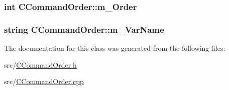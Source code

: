 \subsubsection[{\texorpdfstring{m\+\_\+\+Order}{m_Order}}]{\setlength{\rightskip}{0pt plus 5cm}int C\+Command\+Order\+::m\+\_\+\+Order}\hypertarget{classCCommandOrder_ab815291bf8d2fa527a2015ce5395d64e}{}\label{classCCommandOrder_ab815291bf8d2fa527a2015ce5395d64e}
\subsubsection[{\texorpdfstring{m\+\_\+\+Var\+Name}{m_VarName}}]{\setlength{\rightskip}{0pt plus 5cm}string C\+Command\+Order\+::m\+\_\+\+Var\+Name\hspace{0.3cm}{\ttfamily [private]}}\hypertarget{classCCommandOrder_a45fb2d9961cefa2347113dc870bec8fb}{}\label{classCCommandOrder_a45fb2d9961cefa2347113dc870bec8fb}


The documentation for this class was generated from the following files\+:\begin{DoxyCompactItemize}
\item 
src/\hyperlink{CCommandOrder_8h}{C\+Command\+Order.\+h}\item 
src/\hyperlink{CCommandOrder_8cpp}{C\+Command\+Order.\+cpp}\end{DoxyCompactItemize}
